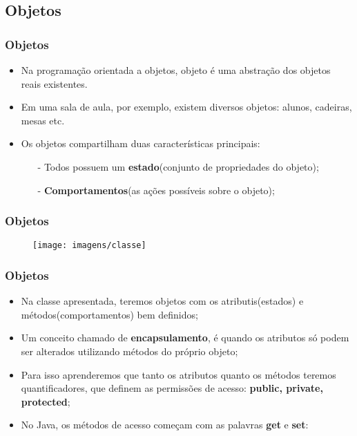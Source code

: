 \documentclass{beamer}
\begin{document}
\subsection{Objetos} %

\begin{frame}
\frametitle{Objetos}
	\begin{itemize}
		\item Na programação orientada a objetos, objeto é uma abstração dos objetos reais existentes.
		\item Em uma sala de aula, por exemplo, existem diversos objetos: alunos, cadeiras, mesas etc. 
		\item Os objetos compartilham duas características principais:
			\begin{itemize}
				\item[-] Todos possuem um \textbf{estado}(conjunto de propriedades do objeto);
				\item[-] \textbf{Comportamentos}(as ações possíveis sobre o objeto);
			\end{itemize}
	\end{itemize}
\end{frame}
\begin{frame}
	\frametitle{Objetos}
	\begin{figure}[h!]
		\centering
		\texttt{[image: imagens/classe]}
	\end{figure}
\end{frame}
\begin{frame}
	\frametitle{Objetos}
	\begin{itemize}
		\item Na classe apresentada, teremos objetos com os atributis(estados) e métodos(comportamentos) bem definidos;
		\item Um conceito chamado de \textbf{encapsulamento}, é quando os atributos só podem ser alterados utilizando métodos do próprio objeto;
		\item Para isso aprenderemos que tanto os atributos quanto os métodos teremos quantificadores, que definem as permissões de acesso: \textbf{public, private, protected};
		\item No Java, os métodos de acesso começam com as palavras \textbf{get} e \textbf{set}:
	\end{itemize}
\end{frame}
\end{document}
